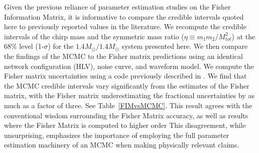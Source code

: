 \documentclass[11pt,a4paper]{emulateapj} 
\begin{document}
Given the previous reliance of parameter estimation studies on the Fisher
Information Matrix, it is informative to compare the credible intervals quoted here 
to previously reported values in the literature.  We recompute the credible intervals 
of the chirp mass and the symmetric mass ratio ($\eta \equiv m_1 m_2 / M_{tot}^2$)
at the 68\% level (1-$\sigma$) for the $1.4M_{\odot}/1.4M_{\odot}$ system presented 
here.  We then compare the findings of the MCMC to the Fisher matrix predictions using
an identical network configuration (HLV), noise curve, and waveform model.  
We compute the Fisher matrix uncertainties 
using a code previously described in \cite{Inadequacies}.  We find that the MCMC credible
 intervals vary significantly from
the estimates of the Fisher matrix, with the Fisher matrix underestimating the 
fractional uncertainties by as much as a factor of three.  See Table~\ref{FIMvsMCMC}.  This 
result agrees with the conventional wisdom surrounding the Fisher Matrix accuracy,
as well as results where the Fisher Matrix is computed to higher order \citep{Vitale2010}
   This disagreement, while 
   unsurprising, emphasizes the importance of employing the full parameter estimation
    machinery of an MCMC when making physically relevant claims.
\end{document}

